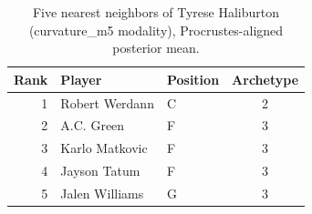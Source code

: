 \begin{table}[htbp]
  \centering\small
  \begin{tabular}{rllc}
    \toprule
    Rank & Player & Position & Archetype \\
    \midrule
    1 & Robert Werdann & C & 2 \\
    2 & A.C. Green & F & 3 \\
    3 & Karlo Matkovic & F & 3 \\
    4 & Jayson Tatum & F & 3 \\
    5 & Jalen Williams & G & 3 \\
    \bottomrule
  \end{tabular}
  \caption{Five nearest neighbors of Tyrese Haliburton (curvature_m5 modality), Procrustes-aligned posterior mean.}
  \label{tab:Tyrese_Haliburton_neighbors_curvature_m5}
\end{table}

